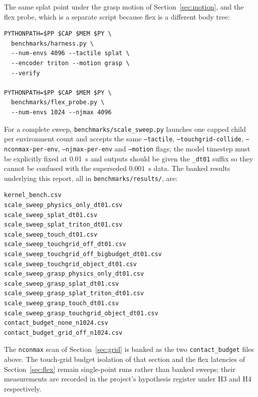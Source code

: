 \documentclass[journal]{IEEEtran}
\begin{document}
The same splat point under the grasp motion of Section~\ref{sec:motion}, and the flex probe, which is a separate script because flex is a different body tree:

{\footnotesize
\begin{verbatim}
PYTHONPATH=$PP $CAP $MEM $PY \
  benchmarks/harness.py \
  --num-envs 4096 --tactile splat \
  --encoder triton --motion grasp \
  --verify

PYTHONPATH=$PP $CAP $MEM $PY \
  benchmarks/flex_probe.py \
  --num-envs 1024 --njmax 4096
\end{verbatim}
}

For a complete sweep, \texttt{benchmarks/scale\_sweep.py} launches one capped child per environment count and accepts the same \texttt{--tactile}, \texttt{--touchgrid-collide}, \texttt{--nconmax-per-env}, \texttt{--njmax-per-env} and \texttt{--motion} flags; the model timestep must be explicitly fixed at 0.01~s and outputs should be given the \texttt{\_dt01} suffix so they cannot be confused with the superseded 0.001~s data. The banked results underlying this report, all in \texttt{benchmarks/results/}, are:

{\footnotesize
\begin{verbatim}
kernel_bench.csv
scale_sweep_physics_only_dt01.csv
scale_sweep_splat_dt01.csv
scale_sweep_splat_triton_dt01.csv
scale_sweep_touch_dt01.csv
scale_sweep_touchgrid_off_dt01.csv
scale_sweep_touchgrid_off_bigbudget_dt01.csv
scale_sweep_touchgrid_object_dt01.csv
scale_sweep_grasp_physics_only_dt01.csv
scale_sweep_grasp_splat_dt01.csv
scale_sweep_grasp_splat_triton_dt01.csv
scale_sweep_grasp_touch_dt01.csv
scale_sweep_grasp_touchgrid_object_dt01.csv
contact_budget_none_n1024.csv
contact_budget_grid_off_n1024.csv
\end{verbatim}
}

The \texttt{nconmax} scan of Section~\ref{sec:grid} is banked as the two \texttt{contact\_budget} files above. The touch-grid budget isolation of that section and the flex latencies of Section~\ref{sec:flex} remain single-point runs rather than banked sweeps; their measurements are recorded in the project's hypothesis register under H3 and H4 respectively.
\end{document}
